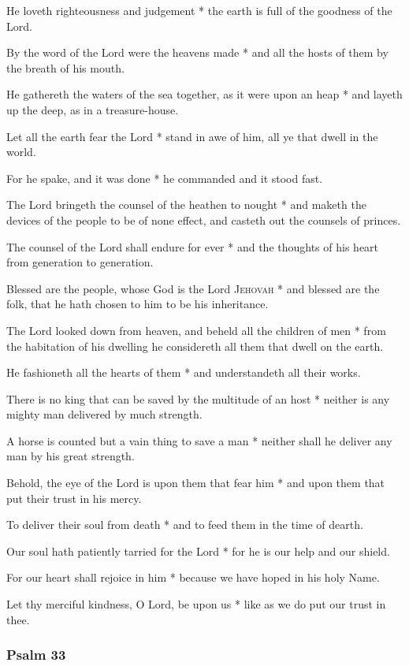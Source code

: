 He loveth righteousness and judgement * the earth is full of the goodness of the Lord.

By the word of the Lord were the heavens made * and all the hosts of them by the breath of his mouth.

He gathereth the waters of the sea together, as it were upon an heap * and layeth up the deep, as in a treasure-house.

Let all the earth fear the Lord * stand in awe of him, all ye that dwell in the world.

For he spake, and it was done * he commanded and it stood fast.

The Lord bringeth the counsel of the heathen to nought * and maketh the devices of the people to be of none effect, and casteth out the counsels of princes.

The counsel of the Lord shall endure for ever * and the thoughts of his heart from generation to generation.

Blessed are the people, whose God is the Lord \textsc{Jehovah} * and blessed are the folk, that he hath chosen to him to be his inheritance.

The Lord looked down from heaven, and beheld all the children of men * from the habitation of his dwelling he considereth all them that dwell on the earth.

He fashioneth all the hearts of them * and understandeth all their works.

There is no king that can be saved by the multitude of an host * neither is any mighty man delivered by much strength.

A horse is counted but a vain thing to save a man * neither shall he deliver any man by his great strength.

Behold, the eye of the Lord is upon them that fear him * and upon them that put their trust in his mercy.

To deliver their soul from death * and to feed them in the time of dearth.

Our soul hath patiently tarried for the Lord * for he is our help and our shield.

For our heart shall rejoice in him * because we have hoped in his holy Name.

Let thy merciful kindness, O Lord, be upon us * like as we do put our trust in thee.

\subsubsection{Psalm 33}

